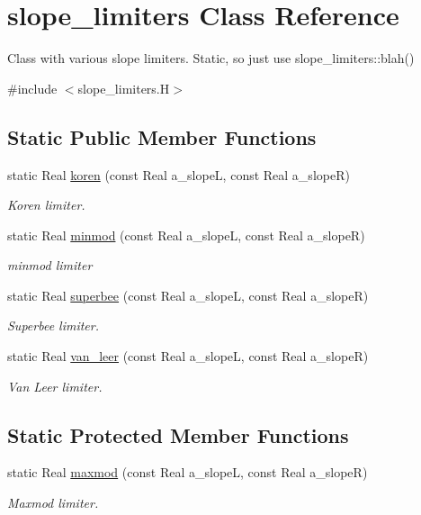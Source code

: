 \hypertarget{classslope__limiters}{}\section{slope\+\_\+limiters Class Reference}
\label{classslope__limiters}


Class with various slope limiters. Static, so just use slope\+\_\+limiters\+::blah()  




{\ttfamily \#include $<$slope\+\_\+limiters.\+H$>$}

\subsection*{Static Public Member Functions}
\begin{DoxyCompactItemize}
\item 
static Real \hyperlink{classslope__limiters_ad950aea98e37d9ecb9a3b63731f1af17}{koren} (const Real a\+\_\+slopeL, const Real a\+\_\+slopeR)
\begin{DoxyCompactList}\small\item\em Koren limiter. \end{DoxyCompactList}\item 
static Real \hyperlink{classslope__limiters_a34fa96132527ec7046ad9f98d33f2e9d}{minmod} (const Real a\+\_\+slopeL, const Real a\+\_\+slopeR)
\begin{DoxyCompactList}\small\item\em minmod limiter \end{DoxyCompactList}\item 
static Real \hyperlink{classslope__limiters_a2f680fe5546e475b4302488b00545b6f}{superbee} (const Real a\+\_\+slopeL, const Real a\+\_\+slopeR)
\begin{DoxyCompactList}\small\item\em Superbee limiter. \end{DoxyCompactList}\item 
static Real \hyperlink{classslope__limiters_a506e22976f185f20212da5be7d333eac}{van\+\_\+leer} (const Real a\+\_\+slopeL, const Real a\+\_\+slopeR)
\begin{DoxyCompactList}\small\item\em Van Leer limiter. \end{DoxyCompactList}\end{DoxyCompactItemize}
\subsection*{Static Protected Member Functions}
\begin{DoxyCompactItemize}
\item 
static Real \hyperlink{classslope__limiters_ac4f043c8f8d7c219fe8ea721f4685e0c}{maxmod} (const Real a\+\_\+slopeL, const Real a\+\_\+slopeR)
\begin{DoxyCompactList}\small\item\em Maxmod limiter. \end{DoxyCompactList}\end{DoxyCompactItemize}



